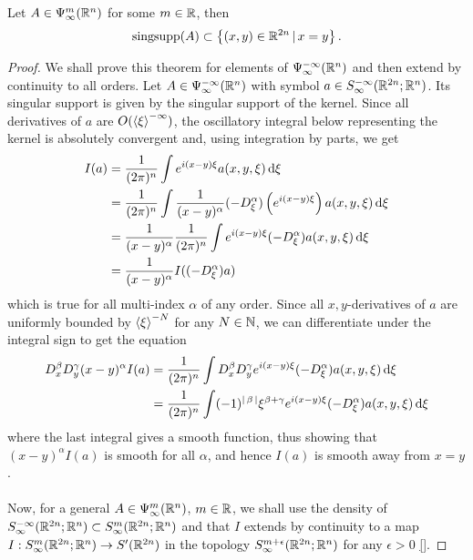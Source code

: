 \documentclass{article}
\begin{document}
\begin{fprop}
    Let $A \in \Psi^m_\infty(\R^n)$ for some $m \in \R$, then
    \[
    \mathrm{sing supp}(A) \subset \set{(x, y) \in \R^{2n} \wh x = y}. 
    \]
\end{fprop}
\begin{proof}
    We shall prove this theorem for elements of $\Psi^{-\infty}_\infty(\R^n)$ and then extend by continuity to all orders. 
    Let $A \in \Psi^{-\infty}_\infty(\R^n)$ with symbol $a \in S^{-\infty}_\infty(\R^{2n}; \R^n)$. Its singular support is given by the singular support of the kernel. Since all derivatives of $a$ are $O(\sym[\xi]^{-\infty})$, the oscillatory integral below representing the kernel is absolutely convergent  and, using integration by parts, we get
    \begin{align*}
    I(a) 
    & = \frac{1}{(2\pi)^n} \int e^{i(x - y) \xi} a(x, y, \xi) \d[\xi] \\
    & = \frac{1}{(2\pi)^n}  \int \frac{1}{(x - y)^\alpha} (-D^\alpha_\xi) \brac{e^{i(x - y) \xi} }a(x, y, \xi) \d[\xi] \\
    & = \frac{1}{(x - y)^\alpha} \frac{1}{(2\pi)^n} \int e^{i(x - y) \xi} (-D^\alpha_\xi) a(x, y, \xi) \d[\xi] \\
    & = \frac{1}{(x - y)^\alpha} I((-D^\alpha_\xi)a)
    \end{align*}
    which is true for all multi-index $\alpha$ of any order. Since all $x, y$-derivatives of $a$ are uniformly bounded by $\sym[\xi]^{-N}$ for any $N \in \N$, we can differentiate under the integral sign to get the equation
    \begin{align*}
    D^\beta_x D^\gamma_y (x - y)^\alpha I(a) 
    & = \frac{1}{(2\pi)^n} \int D^\beta_x D^\gamma_y e^{i(x - y) \xi} (-D^\alpha_\xi) a(x, y, \xi) \d[\xi] \\
    & = \frac{1}{(2\pi)^n} \int (-1)^{\abs{\beta}}\xi^{\beta + \gamma}e^{i(x - y) \xi} (-D^\alpha_\xi) a(x, y, \xi) \d[\xi] \\
    \end{align*}
    where the last integral gives a smooth function, thus showing that $(x - y)^\alpha I(a)$ is smooth for all $\alpha$, and hence $I(a)$ is smooth away from $x = y$. \\
    \\
    Now, for a general $A \in \Psi^m_\infty(\R^n)$, $m \in \R$, we shall use the  density of $S^{-\infty}_\infty(\R^{2n}; \R^n) \subset S^{m}_\infty(\R^{2n}; \R^n)$ and that $I$ extends by continuity to a map $I : S^{m}_\infty(\R^{2n}; \R^n) \to S'(\R^{2n})$ in the topology $S^{m + \epsilon}_\infty(\R^{2n}; \R^n)$ for any $\epsilon > 0$  \ref{}. 
    
    
\end{proof}
\end{document}
